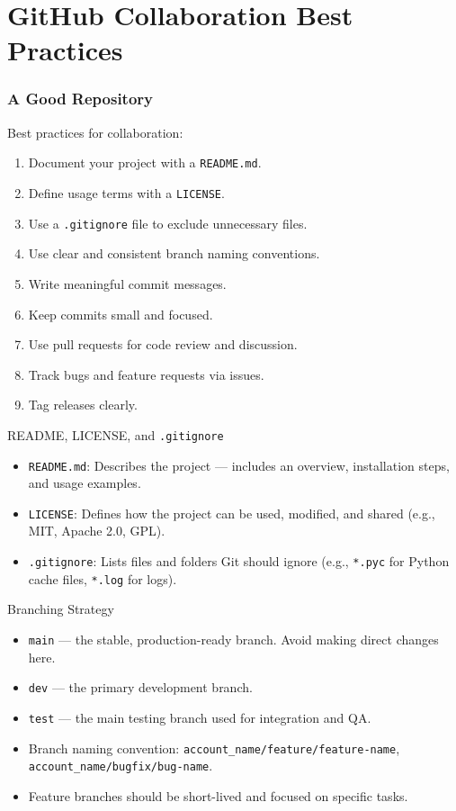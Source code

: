 \documentclass[12pt]{beamer}
\begin{document}
\section{GitHub Collaboration Best Practices}

\begin{frame}
  \frametitle{A Good Repository}
  Best practices for collaboration:
  \begin{enumerate}
    \item Document your project with a \texttt{README.md}.
    \item Define usage terms with a \texttt{LICENSE}.
    \item Use a \texttt{.gitignore} file to exclude unnecessary files.
    \item Use clear and consistent branch naming conventions.
    \item Write meaningful commit messages.
    \item Keep commits small and focused.
    \item Use pull requests for code review and discussion.
    \item Track bugs and feature requests via issues.
    \item Tag releases clearly.
  \end{enumerate}
\end{frame}

\begin{frame}{README, LICENSE, and \texttt{.gitignore}}
  \begin{itemize}
    \setlength\itemsep{1em}
    \item \texttt{README.md}: Describes the project — includes an overview, installation steps, and usage examples.
    \item \texttt{LICENSE}: Defines how the project can be used, modified, and shared (e.g., MIT, Apache 2.0, GPL).
    \item \texttt{.gitignore}: Lists files and folders Git should ignore (e.g., \texttt{*.pyc} for Python cache files, \texttt{*.log} for logs).
  \end{itemize}
\end{frame}

\begin{frame}{Branching Strategy}
  \begin{itemize}
    \setlength\itemsep{1em}
    \item \texttt{main} — the stable, production-ready branch. Avoid making direct changes here.
    \item \texttt{dev} — the primary development branch.
    \item \texttt{test} — the main testing branch used for integration and QA.
    \item Branch naming convention: \texttt{account\_name/feature/feature-name}, \texttt{account\_name/bugfix/bug-name}.
    \item Feature branches should be short-lived and focused on specific tasks.
  \end{itemize}
\end{frame}
\end{document}
